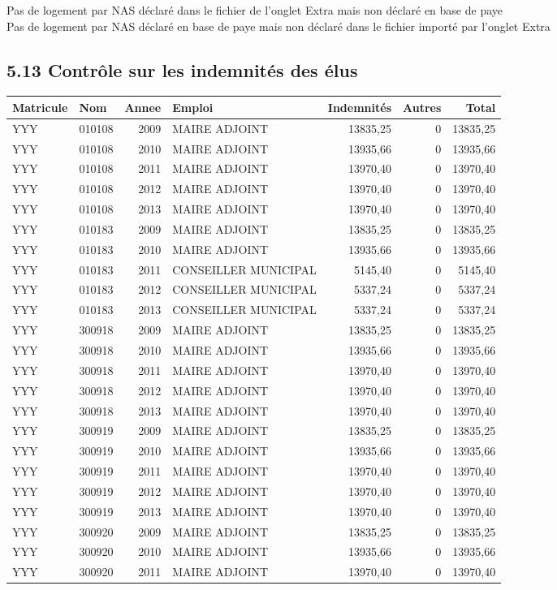 Pas de logement par NAS déclaré dans le fichier de l'onglet Extra mais
non déclaré en base de paye\\
Pas de logement par NAS déclaré en base de paye mais non déclaré dans le
fichier importé par l'onglet Extra

\hypertarget{controle-sur-les-indemnites-des-elus}{%
\subsection{5.13 Contrôle sur les indemnités des
élus}\label{controle-sur-les-indemnites-des-elus}}

\begin{longtable}[]{@{}llrlrrr@{}}
\toprule
Matricule & Nom & Annee & Emploi & Indemnités & Autres &
Total\tabularnewline
\midrule
\endhead
YYY & 010108 & 2009 & MAIRE ADJOINT & 13835,25 & 0 &
13835,25\tabularnewline
YYY & 010108 & 2010 & MAIRE ADJOINT & 13935,66 & 0 &
13935,66\tabularnewline
YYY & 010108 & 2011 & MAIRE ADJOINT & 13970,40 & 0 &
13970,40\tabularnewline
YYY & 010108 & 2012 & MAIRE ADJOINT & 13970,40 & 0 &
13970,40\tabularnewline
YYY & 010108 & 2013 & MAIRE ADJOINT & 13970,40 & 0 &
13970,40\tabularnewline
YYY & 010183 & 2009 & MAIRE ADJOINT & 13835,25 & 0 &
13835,25\tabularnewline
YYY & 010183 & 2010 & MAIRE ADJOINT & 13935,66 & 0 &
13935,66\tabularnewline
YYY & 010183 & 2011 & CONSEILLER MUNICIPAL & 5145,40 & 0 &
5145,40\tabularnewline
YYY & 010183 & 2012 & CONSEILLER MUNICIPAL & 5337,24 & 0 &
5337,24\tabularnewline
YYY & 010183 & 2013 & CONSEILLER MUNICIPAL & 5337,24 & 0 &
5337,24\tabularnewline
YYY & 300918 & 2009 & MAIRE ADJOINT & 13835,25 & 0 &
13835,25\tabularnewline
YYY & 300918 & 2010 & MAIRE ADJOINT & 13935,66 & 0 &
13935,66\tabularnewline
YYY & 300918 & 2011 & MAIRE ADJOINT & 13970,40 & 0 &
13970,40\tabularnewline
YYY & 300918 & 2012 & MAIRE ADJOINT & 13970,40 & 0 &
13970,40\tabularnewline
YYY & 300918 & 2013 & MAIRE ADJOINT & 13970,40 & 0 &
13970,40\tabularnewline
YYY & 300919 & 2009 & MAIRE ADJOINT & 13835,25 & 0 &
13835,25\tabularnewline
YYY & 300919 & 2010 & MAIRE ADJOINT & 13935,66 & 0 &
13935,66\tabularnewline
YYY & 300919 & 2011 & MAIRE ADJOINT & 13970,40 & 0 &
13970,40\tabularnewline
YYY & 300919 & 2012 & MAIRE ADJOINT & 13970,40 & 0 &
13970,40\tabularnewline
YYY & 300919 & 2013 & MAIRE ADJOINT & 13970,40 & 0 &
13970,40\tabularnewline
YYY & 300920 & 2009 & MAIRE ADJOINT & 13835,25 & 0 &
13835,25\tabularnewline
YYY & 300920 & 2010 & MAIRE ADJOINT & 13935,66 & 0 &
13935,66\tabularnewline
YYY & 300920 & 2011 & MAIRE ADJOINT & 13970,40 & 0 &
13970,40\tabularnewline

\end{longtable}
